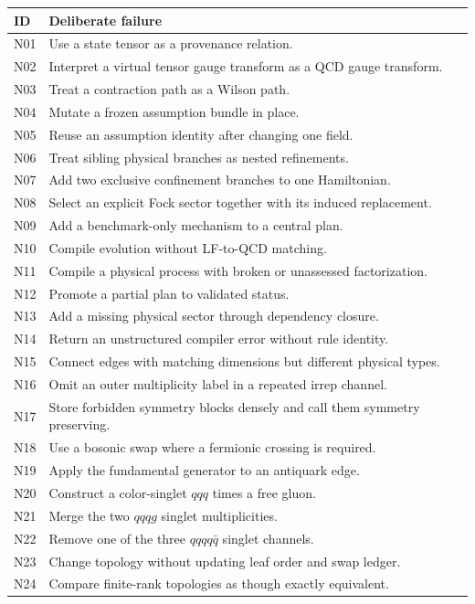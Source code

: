 \documentclass[11pt]{article}
\begin{document}
\begin{longtable}{L{0.10\textwidth}L{0.82\textwidth}}
\toprule
ID & Deliberate failure\\
\midrule
\endhead
N01 & Use a state tensor as a provenance relation.\\
N02 & Interpret a virtual tensor gauge transform as a QCD gauge transform.\\
N03 & Treat a contraction path as a Wilson path.\\
N04 & Mutate a frozen assumption bundle in place.\\
N05 & Reuse an assumption identity after changing one field.\\
N06 & Treat sibling physical branches as nested refinements.\\
N07 & Add two exclusive confinement branches to one Hamiltonian.\\
N08 & Select an explicit Fock sector together with its induced replacement.\\
N09 & Add a benchmark-only mechanism to a central plan.\\
N10 & Compile evolution without LF-to-QCD matching.\\
N11 & Compile a physical process with broken or unassessed factorization.\\
N12 & Promote a partial plan to validated status.\\
N13 & Add a missing physical sector through dependency closure.\\
N14 & Return an unstructured compiler error without rule identity.\\
N15 & Connect edges with matching dimensions but different physical types.\\
N16 & Omit an outer multiplicity label in a repeated irrep channel.\\
N17 & Store forbidden symmetry blocks densely and call them symmetry preserving.\\
N18 & Use a bosonic swap where a fermionic crossing is required.\\
N19 & Apply the fundamental generator to an antiquark edge.\\
N20 & Construct a color-singlet \(qqq\) times a free gluon.\\
N21 & Merge the two \(qqqg\) singlet multiplicities.\\
N22 & Remove one of the three \(qqqq\bar q\) singlet channels.\\
N23 & Change topology without updating leaf order and swap ledger.\\
N24 & Compare finite-rank topologies as though exactly equivalent.\\

\end{longtable}
\end{document}
